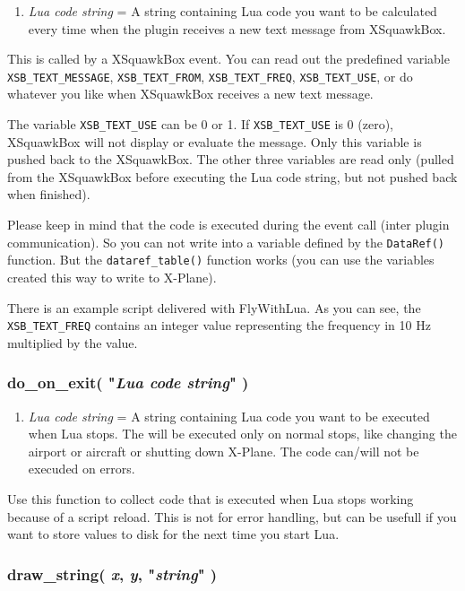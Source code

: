 \documentclass[11pt,parskip=half,a4paper]{scrartcl}
\begin{document}
\begin{enumerate}
	\item \emph{Lua code string} = A string containing Lua code you want to be calculated every time when the plugin receives a new text message from XSquawkBox.
\end{enumerate}

This is called by a XSquawkBox event. You can read out the predefined variable \verb|XSB_TEXT_MESSAGE|, \verb|XSB_TEXT_FROM|, \verb|XSB_TEXT_FREQ|, \verb|XSB_TEXT_USE|, or do whatever you like when XSquawkBox receives a new text message.

The variable \verb|XSB_TEXT_USE| can be 0 or 1. If \verb|XSB_TEXT_USE| is 0 (zero), XSquawkBox will not display or evaluate the message. Only this variable is pushed back to the XSquawkBox. The other three variables are read only (pulled from the XSquawkBox before executing the Lua code string, but not pushed back when finished).

Please keep in mind that the code is executed during the event call (inter plugin communication). So you can not write into a variable defined by the \verb|DataRef()| function. But the \verb|dataref_table()| function works (you can use the variables created this way to write to X-Plane).

There is an example script delivered with FlyWithLua. As you can see, the \verb|XSB_TEXT_FREQ| contains an integer value representing the frequency in 10 Hz multiplied by the value.

\subsubsection{do\_on\_exit( "\emph{Lua code string}" )}

\begin{enumerate}
	\item \emph{Lua code string} = A string containing Lua code you want to be executed when Lua stops. The will be executed only on normal stops, like changing the airport or aircraft or shutting down X-Plane. The code can/will not be execuded on errors.
\end{enumerate}

Use this function to collect code that is executed when Lua stops working because of a script reload. This is not for error handling, but can be usefull if you want to store values to disk for the next time you start Lua.

\subsubsection{draw\_string( \emph{x}, \emph{y}, "\emph{string}" )}
\end{document}
